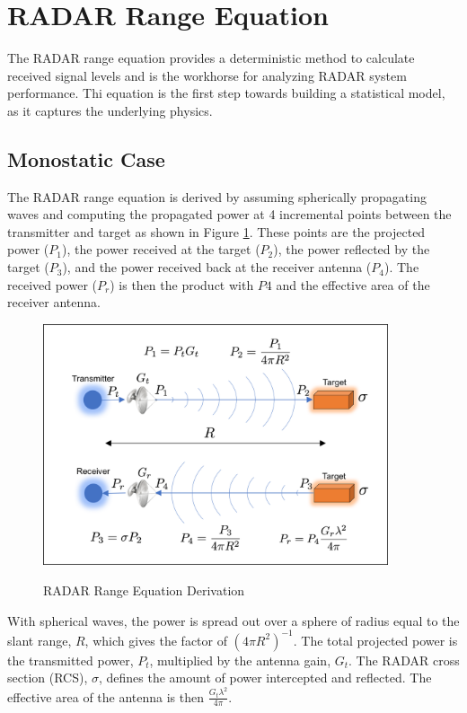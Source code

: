 \section{RADAR Range Equation} 
The RADAR range equation provides a deterministic method to calculate received signal levels and is the workhorse for analyzing RADAR system performance. Thi equation is the first step towards building a statistical model, as it captures the underlying physics.


\subsection{Monostatic Case}
The RADAR range equation is derived by assuming spherically propagating waves and computing the propagated power at 4 incremental points between the transmitter and target as shown in Figure \ref{intro_fig:1}. These points are the projected power ($P_1$), the power received at the target ($P_2$), the power reflected by the target ($P_3$), and the power received back at the receiver antenna ($P_4$). The received power ($P_r$) is then the product with $P4$ and the effective area of the receiver antenna.

\begin{figure}[H]
  \begin{center}
\includegraphics[width=4in]{../media/multistatic/radar_range_equation.png}
  \end{center}
  \renewcommand{\baselinestretch}{1} \small\normalsize
  \begin{quote}
    \caption[RADAR Range Equation Derivation]{RADAR Range Equation Derivation \label{intro_fig:1}}
  \end{quote}
\end{figure}
\renewcommand{\baselinestretch}{2} \small\normalsize

With spherical waves, the power is spread out over a sphere of radius equal to the slant range, $R$, which gives the factor of $\left( 4\pi R^2 \right)^{-1}$. The total projected power is the transmitted power, $P_t$, multiplied by the antenna gain, $G_t$. The RADAR cross section (RCS), $\sigma$, defines the amount of power intercepted and reflected. The effective area of the antenna is then $\frac{G_t\lambda^2}{4\pi}$.


